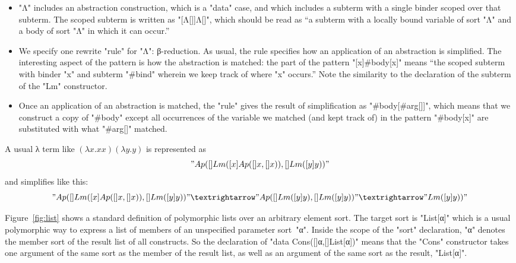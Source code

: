 \documentclass[letterpaper,11pt]{article}
\begin{document}
\begin{example}
\begin{itemize}
  \item "Λ" includes an abstraction construction, which is a "data" case, and which includes a
    subterm with a single binder scoped over that subterm. The scoped subterm is written as
    "[Λ[]]Λ[]", which should be read as ``a subterm with a locally bound variable of sort "Λ" and a
    body of sort "Λ" in which it can occur.''

  \item We specify one rewrite "rule" for "Λ": β-reduction. As usual, the rule specifies how an
    application of an abstraction is simplified. The interesting aspect of the pattern is how the
    abstraction is matched: the part of the pattern "[x]#body[x]" means ``the scoped subterm with
    binder "x" and subterm "#bind" wherein we keep track of where "x" occurs.'' Note the similarity
    to the declaration of the subterm of the "Lm" constructor.

  \item Once an application of an abstraction is matched, the "rule" gives the result of
    simplification as "#body[#arg[]]", which means that we construct a copy of "#body" except all
    occurrences of the variable we matched (and kept track of) in the pattern "#body[x]" are
    substituted with what "#arg[]" matched.

  \end{itemize}
  A usual λ term like $(λx.x x)(λy.y)$ is represented as
  \begin{displaymath}
    "Ap([]Lm([x]Ap([]x, []x)), []Lm([y]y))"    
  \end{displaymath}
  and simplifies like this:
  \begin{displaymath}
    "Ap([]Lm([x]Ap([]x, []x)), []Lm([y]y))" →
    "Ap([]Lm([y]y), []Lm([y]y))" →
    "Lm([y]y))"
  \end{displaymath}
\end{example}

\begin{example}[lists]\label{ex:list}
  Figure~\ref{fig:list} shows a standard definition of polymorphic lists over an arbitrary element
  sort.  The target sort is "List[α]" which is a usual polymorphic way to express a list of members
  of an unspecified parameter sort~"α".  Inside the scope of the "sort" declaration, "α" denotes the
  member sort of the result list of all constructs. So the declaration of "data Cons([]α,[]List[α])"
  means that the "Cons" constructor takes one argument of the same sort as the member of the result
  list, as well as an argument of the same sort as the result, "List[α]".

\end{example}
\end{document}
